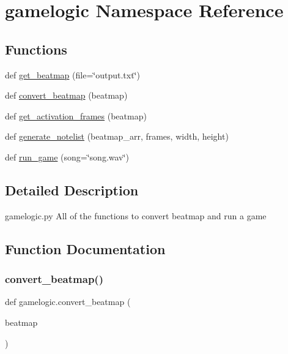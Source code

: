 \hypertarget{namespacegamelogic}{}\section{gamelogic Namespace Reference}
\label{namespacegamelogic}
\subsection*{Functions}
\begin{DoxyCompactItemize}
\item 
def \hyperlink{namespacegamelogic_a6a186cca17da365aaedb4e791cdd9989}{get\+\_\+beatmap} (file=\char`\"{}output.\+txt\char`\"{})
\item 
def \hyperlink{namespacegamelogic_ae2132679a5167f57810697fbc7b9ad3d}{convert\+\_\+beatmap} (beatmap)
\item 
def \hyperlink{namespacegamelogic_a9b9c9fd58c8093e039985584ad7c661b}{get\+\_\+activation\+\_\+frames} (beatmap)
\item 
def \hyperlink{namespacegamelogic_a08f1091c44c6dc43a56a34aec202e888}{generate\+\_\+notelist} (beatmap\+\_\+arr, frames, width, height)
\item 
def \hyperlink{namespacegamelogic_af89bec3eb64303877585a65db089f86d}{run\+\_\+game} (song=\char`\"{}song.\+wav\char`\"{})
\end{DoxyCompactItemize}


\subsection{Detailed Description}
\begin{DoxyVerb}gamelogic.py
All of the functions to convert beatmap and run a game
\end{DoxyVerb}
 

\subsection{Function Documentation}
\mbox{\label{namespacegamelogic_ae2132679a5167f57810697fbc7b9ad3d}} 
\subsubsection{\texorpdfstring{convert\+\_\+beatmap()}{convert\_beatmap()}}
{\footnotesize\ttfamily def gamelogic.\+convert\+\_\+beatmap (\begin{DoxyParamCaption}\item[{}]{beatmap }\end{DoxyParamCaption})}

